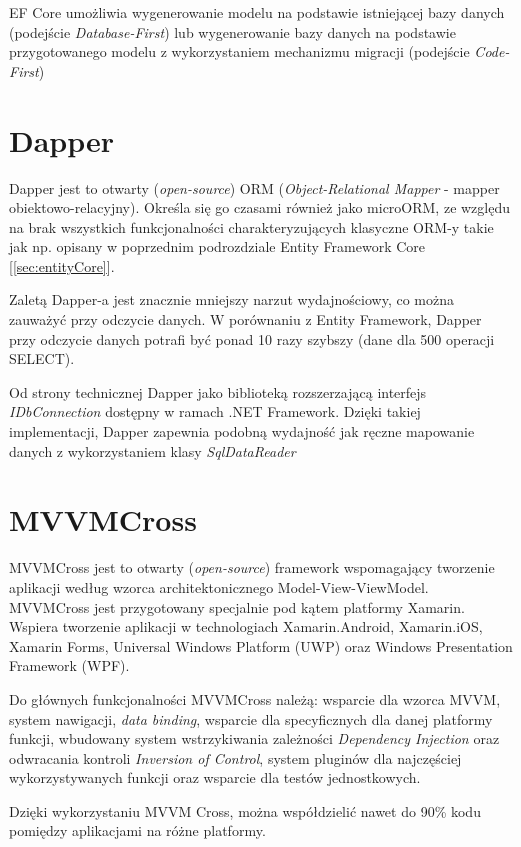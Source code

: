 EF Core umożliwia wygenerowanie modelu na podstawie istniejącej bazy danych (podejście \textit{Database-First}) lub wygenerowanie bazy danych na podstawie przygotowanego modelu z wykorzystaniem mechanizmu migracji (podejście \textit{Code-First})\cite{QuickOve99:online}

\section{Dapper}
\label{sec:dapper}
Dapper jest to otwarty (\textit{open-source}) ORM (\textit{Object-Relational Mapper} - mapper obiektowo-relacyjny). Określa się go czasami również jako microORM, ze względu na brak wszystkich funkcjonalności charakteryzujących klasyczne ORM-y takie jak np. opisany w poprzednim podrozdziale Entity Framework Core [\ref{sec:entityCore}]. 

Zaletą Dapper-a jest znacznie mniejszy narzut wydajnościowy, co można zauważyć przy odczycie danych. W porównaniu z Entity Framework, Dapper przy odczycie danych potrafi być ponad 10 razy szybszy (dane dla 500 operacji SELECT).

Od strony technicznej Dapper jako biblioteką rozszerzającą interfejs \textit{IDbConnection} dostępny w ramach .NET Framework. Dzięki takiej implementacji, Dapper zapewnia podobną wydajność jak ręczne mapowanie danych z wykorzystaniem klasy \textit{SqlDataReader} \cite{StackExc69:online}  
\section{MVVMCross}
\label{sec:mvvmCross}
MVVMCross jest to otwarty (\textit{open-source}) framework wspomagający tworzenie aplikacji według wzorca architektonicznego Model-View-ViewModel. MVVMCross jest przygotowany specjalnie pod kątem platformy Xamarin. Wspiera tworzenie aplikacji w technologiach Xamarin.Android, Xamarin.iOS, Xamarin Forms, Universal Windows Platform (UWP) oraz Windows Presentation Framework (WPF).

Do głównych funkcjonalności MVVMCross należą: wsparcie dla wzorca MVVM, system nawigacji, \textit{data binding}, wsparcie dla specyficznych dla danej platformy funkcji, wbudowany system wstrzykiwania zależności \textit{Dependency Injection} oraz odwracania kontroli \textit{Inversion of Control}, system pluginów dla najczęściej wykorzystywanych funkcji oraz wsparcie dla testów jednostkowych. \cite{GettingS94:online}

Dzięki wykorzystaniu MVVM Cross, można współdzielić nawet do 90\% kodu pomiędzy aplikacjami na różne platformy.
